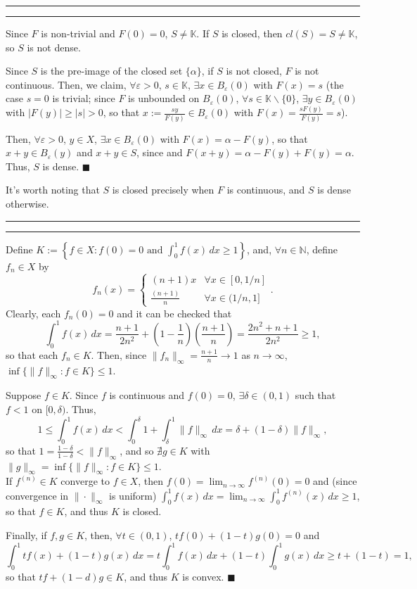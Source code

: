 \documentclass[11pt]{article}
\newcounter{questionCounter}
\newcounter{partCounter}[questionCounter]
\newenvironment{question}[2][\arabic{questionCounter}]{%
    \setcounter{partCounter}{0}%
    \vspace{.25in} \hrule \vspace{0.5em}%
        \noindent{\bf #2}%
    \vspace{0.8em} \hrule \vspace{.10in}%
    \addtocounter{questionCounter}{1}%
}{}
\renewcommand{\qed}{\quad $\blacksquare$}
\newcommand{\sminus}{\backslash}
\newcommand{\N}{\mathbb{N}} %
\newcommand{\K}{\mathbb{K}} %
\newcommand{\e}{\varepsilon} %
\begin{document}
\newpage
\begin{question}{Problem 8}
Since $F$ is non-trivial and $F(0) = 0$, $S \neq \K$. If $S$ is closed,
then $cl(S) = S \neq \K$, so $S$ is not dense.

Since $S$ is the pre-image of the closed set $\{\alpha\}$, if $S$ is not
closed, $F$ is not continuous. Then, we claim, $\forall \e > 0$, $s \in
\K$, $\exists x \in B_{\e}(0)$ with $F(x) = s$ (the case $s = 0$ is trivial;
since $F$ is unbounded on $B_{\e}(0)$, $\forall s \in \K \sminus \{0\}$,
$\exists y \in B_{\e}(0)$ with $|F(y)| \geq |s| > 0$, so that
$x := \frac{sy}{F(y)} \in B_{\e}(0)$ with $F(x) = \frac{sF(y)}{F(y)} = s$).

Then, $\forall \e > 0$, $y \in X$, $\exists x \in B_{\e}(0)$ with
$F(x) = \alpha -  F(y)$, so that $x + y \in B_{\e}(y)$ and $x + y \in S$, since
and $F(x + y) = \alpha - F(y) + F(y) = \alpha$. Thus, $S$ is dense. \qed

It's worth noting that $S$ is closed precisely when $F$ is continuous, and $S$
is dense otherwise.
\end{question}

\begin{question}{Problem 9}
Define
$\displaystyle K
 := \left\{f \in X : f(0) = 0 \mbox{ and } \int_0^1 f(x) \, dx \geq 1\right\}
$,
and, $\forall n \in \N$, define $f_n \in X$ by
\[f_n(x) =
    \left\{
        \begin{array}{cl}
            (n + 1)x & \forall x \in [0,1/n] \\
            \frac{(n + 1)}{n} & \forall x \in (1/n,1]
        \end{array}
    \right..
\]
Clearly, each $f_n(0) = 0$ and it can be checked that
\[\int_0^1 f(x) \, dx
 = \frac{n + 1}{2n^2}
 + \left( 1 - \frac1n \right)\left( \frac{n + 1}{n} \right)
 = \frac{2n^2 + n + 1}{2n^2} \geq 1,
\]
so that each $f_n \in K$. Then, since
$\|f_n\|_{\infty} = \frac{n + 1}{n} \rightarrow 1$ as $n \rightarrow \infty$,
$\inf\{\|f\|_{\infty} : f \in K\} \leq 1$.

Suppose $f \in K$. Since $f$ is continuous and $f(0) = 0$,
$\exists \delta \in (0,1)$ such that $f < 1$ on $[0,\delta)$. Thus,
\[1
 \leq \int_0^1 f(x) \, dx
 < \int_0^{\delta} 1 + \int_{\delta}^1 \|f\|_{\infty} \, dx
 = \delta + (1 - \delta)\|f\|_{\infty},
\]
so that $1 = \frac{1 - \delta}{1 - \delta} < \|f\|_{\infty}$, and so
$\nexists g \in K$ with
$\|g\|_{\infty} = \inf\{\|f\|_{\infty} : f \in K\} \leq 1$. \\

If $f^{(n)} \in K$ converge to $f \in X$, then 
$f(0) = \lim_{n \rightarrow \infty} f^{(n)}(0) = 0$ and (since convergence in
$\|\cdot\|_{\infty}$ is uniform)
$\displaystyle \int_0^1 f(x) \, dx
 = \lim_{n \rightarrow \infty} \int_0^1 f^{(n)}(x) \, dx
 \geq 1$, so that $f \in K$, and thus $K$ is closed.

Finally, if $f,g \in K$, then, $\forall t \in (0,1)$,
$tf(0) + (1 - t)g(0) = 0$ and
\[\int_0^1 tf(x) + (1 - t)g(x) \, dx
 = t\int_0^1 f(x) \, dx + (1 - t) \int_0^1 g(x) \, dx
 \geq t + (1 - t)
 = 1,
\]
so that $tf + (1 - d)g \in K$, and thus $K$ is convex. \qed
\end{question}
\end{document}
